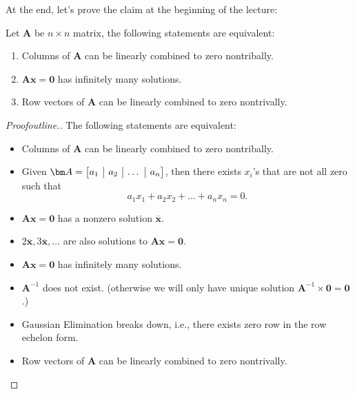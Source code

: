 At the end, let's prove the claim at the beginning of the lecture:
\begin{theorem}
Let $\bm A$ be $n\times n$ matrix, the following statements are equivalent:
\begin{enumerate}
\item
Columns of $\bm A$ can be linearly combined to zero nontribally.
\item
$\bm{Ax} = \bm 0$ has infinitely many solutions.
\item
Row vectors of $\bm A$ can be linearly combined to zero nontrivally.
\end{enumerate}
\end{theorem}
\begin{proof}[Proofoutline.]
The following statements are equivalent:
\begin{itemize}
\item
Columns of $\bm A$ can be linearly combined to zero nontribally.
\item
Given $\bm A = \left[
\begin{array}{@{}c|c|c|c@{}}
a_1&a_2&\dots&a_n
\end{array}\right]$, then there exists $x_i$'s that are not all zero such that 
\[
a_1x_1+a_2x_2+\dots+a_nx_n = 0.
\]
\item
$\bm{Ax} = \bm 0$ has a nonzero solution $\overline{\bm x}$.
\item
$2\overline{\bm x},3\overline{\bm x},\dots$ are also solutions to $\bm{Ax} = \bm 0$.
\item
$\bm{Ax} = \bm 0$ has infinitely many solutions.
\item
$\bm{A}^{-1}$ does not exist. (otherwise we will only have unique solution $\bm A^{-1}\times \bm 0 = \bm 0$.)
\item
Gaussian Elimination breaks down, i.e., there exists zero row in the row echelon form.
\item
Row vectors of $\bm A$ can be linearly combined to zero nontrivally.
\end{itemize}
\end{proof}














